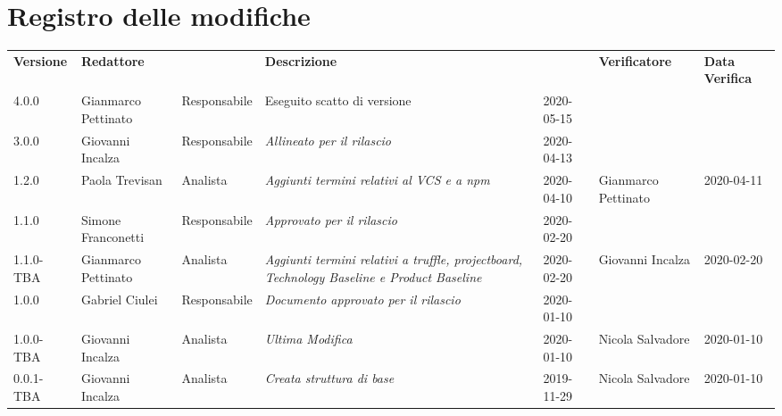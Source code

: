 \section*{Registro delle modifiche}
\renewcommand{\arraystretch}{1.8}
  \setlength\LTleft{-1.7cm}
  \begin{longtable}{|p{1.7cm}|p{2cm}|p{2.5cm}|p{3cm}|p{1.7cm}|p{2cm}|p{2.3cm}|}
    \hline
    \rowcolor{header}
    \textbf{Versione} & \textbf{Redattore} & \centering{\textbf{Ruolo}} & \textbf{Descrizione} &      \centering{\textbf{Data}} & \textbf{Verificatore} & \textbf{Data Verifica} \\
    4.0.0 & Gianmarco Pettinato & Responsabile & Eseguito scatto di versione & 2020-05-15 & &\\
    3.0.0 & Giovanni Incalza & Responsabile & \small{\textit{Allineato per il rilascio}} & 2020-04-13 & & \\
    1.2.0 & Paola Trevisan & Analista & \small{\textit{Aggiunti termini relativi al VCS e a npm}} & 2020-04-10 & Gianmarco Pettinato & 2020-04-11 \\
    1.1.0 & Simone Franconetti & Responsabile & \small{\textit{Approvato per il rilascio}} & 2020-02-20 & & \\
    1.1.0-TBA & Gianmarco Pettinato & Analista & \small{\textit{Aggiunti termini relativi a truffle, projectboard, Technology Baseline e Product Baseline}} & 2020-02-20 & Giovanni Incalza & 2020-02-20\\
    1.0.0 & Gabriel Ciulei & Responsabile & \small{\textit{ Documento approvato per il rilascio }} & 2020-01-10 & &\\
    1.0.0-TBA & Giovanni Incalza & Analista & \small{\textit{ Ultima Modifica }} & 2020-01-10 & Nicola Salvadore & 2020-01-10\\
    0.0.1-TBA & Giovanni Incalza & Analista & \small{\textit{ Creata struttura di base }} & 2019-11-29 & Nicola Salvadore & 2020-01-10 \\
    \hline
  \end{longtable}
  \setlength\LTleft{0cm}
